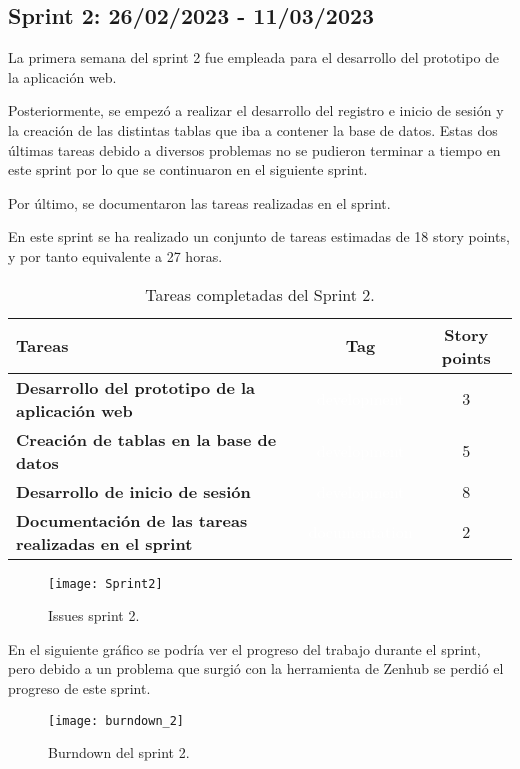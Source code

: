 \subsection{Sprint 2: 26/02/2023 - 11/03/2023}
La primera semana del sprint 2 fue empleada para el desarrollo del prototipo de la aplicación web.

Posteriormente, se empezó a realizar el desarrollo del registro e inicio de sesión y la creación de las distintas tablas que iba a contener la base de datos. Estas dos últimas tareas debido a diversos problemas no se pudieron terminar a tiempo en este sprint por lo que se continuaron en el siguiente sprint.

Por último, se documentaron las tareas realizadas en el sprint.

En este sprint se ha realizado un conjunto de tareas estimadas de 18 story points, y por tanto equivalente a 27 horas.

\begin{table}[ht!]
    \centering
    \resizebox{15cm}{!} {
    \begin{tabular}{|l|c|c|}
    \hline
    \rowcolor[rgb]{0.99,0.93,0.93}
    \textbf{Tareas}     &\textbf{Tag}     & \textbf{Story points} \\ \hline
    \textbf{Desarrollo del prototipo de la aplicación web}         &\cellcolor[rgb]{0.99,0.83,0.93}\textcolor{white}{development}      &3 \\ \hline 
    \textbf{Creación de tablas en la base de datos}         &\cellcolor[rgb]{0.99,0.83,0.93}\textcolor{white}{development}      &5 \\ \hline 
    \textbf{Desarrollo de inicio de sesión}         &\cellcolor[rgb]{0.99,0.83,0.93}\textcolor{white}{development}      &8 \\ \hline 
    \textbf{Documentación de las tareas realizadas en el sprint}         &\cellcolor[rgb]{0.0,0.33,0.71}\textcolor{white}{documentation}      &2 \\ \hline 
    \end{tabular}}
    \caption{Tareas completadas del Sprint 2.}
    \label{tab:my_label}
\end{table}

\begin{figure}[htb]
    \centering
    \texttt{[image: Sprint2]}
    \caption{Issues sprint 2.}
    \label{fig:Sprint2}
\end{figure}
\newpage

En el siguiente gráfico se podría ver el progreso del trabajo durante el sprint, pero debido a un problema que surgió con la herramienta de Zenhub se perdió el progreso de este sprint.
\newpage
\begin{figure}[htb]
    \centering
    \texttt{[image: burndown\_2]}
    \caption{Burndown del sprint 2.}
    \label{fig:burndown_2}
\end{figure}

